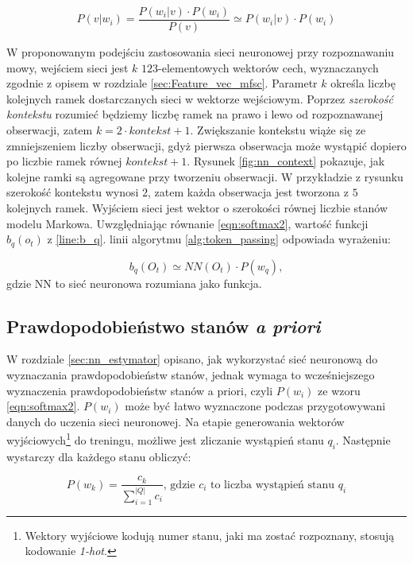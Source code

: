 \documentclass[shortabstract, mgr]{iithesis}
\begin{document}
		\begin{equation}
			P(v|w_i) = \frac{P(w_i|v) \cdot P(w_i)}{P(v)}\simeq P(w_i|v) \cdot P(w_i)
			\label{eqn:softmax2}
		\end{equation}
		
		 W proponowanym podejściu zastosowania sieci neuronowej przy rozpoznawaniu mowy, wejściem sieci jest $k$ $123$-elementowych wektorów cech, wyznaczanych zgodnie z opisem w rozdziale \ref{sec:Feature_vec_mfsc}. Parametr $k$ określa liczbę kolejnych ramek dostarczanych sieci w wektorze wejściowym. Poprzez \textit{szerokość kontekstu} rozumieć będziemy liczbę ramek na prawo i lewo od rozpoznawanej obserwacji, zatem $k = 2 \cdot kontekst + 1$. Zwiększanie kontekstu wiąże się ze zmniejszeniem liczby obserwacji, gdyż pierwsza obserwacja może wystąpić dopiero po liczbie ramek równej $kontekst + 1$. Rysunek \ref{fig:nn_context} pokazuje, jak kolejne ramki są agregowane przy tworzeniu obserwacji. W przykładzie z rysunku szerokość kontekstu wynosi $2$, zatem każda obserwacja jest tworzona z $5$ kolejnych ramek. Wyjściem sieci jest wektor o szerokości równej liczbie stanów modelu Markowa. Uwzględniając równanie \ref{eqn:softmax2}, wartość funkcji $b_q(o_t)$ z \ref{line:b_q}. linii algorytmu \ref{alg:token_passing} odpowiada wyrażeniu:
		 
		 \begin{equation}
			 b_q(O_t) \simeq NN(O_t) \cdot P(w_q),			 
		 \end{equation}
		 gdzie NN to sieć neuronowa rozumiana jako funkcja.
		
	\subsection{Prawdopodobieństwo stanów \textit{a priori} }
		\label{sec:ppb_apriori}
		W rozdziale \ref{sec:nn_estymator} opisano, jak wykorzystać sieć neuronową do wyznaczania prawdopodobieństw stanów, jednak wymaga to wcześniejszego wyznaczenia prawdopodobieństw stanów a priori, czyli $P(w_i)$ ze wzoru \ref{eqn:softmax2}. 
		$P(w_i)$ może być łatwo wyznaczone podczas przygotowywani danych do uczenia sieci neuronowej. Na etapie generowania wektorów wyjściowych\footnote{Wektory wyjściowe kodują numer stanu, jaki ma zostać rozpoznany, stosują kodowanie \textit{1-hot}.} do treningu, możliwe jest zliczanie wystąpień stanu $q_i$.
		Następnie wystarczy dla każdego stanu obliczyć:
		
		\begin{equation}
			P(w_k) = \frac{c_k}{\sum_{i=1}^{|Q|} c_i}
			\text{,   gdzie $c_i$ to liczba wystąpień stanu $q_i$}
		\end{equation}
		
\end{document}
